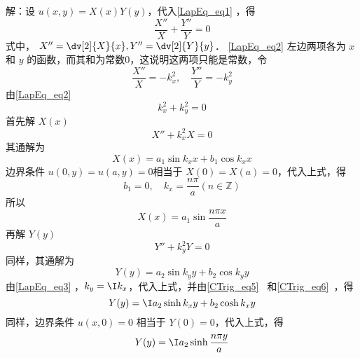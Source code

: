解：设 $u(x,y)=X(x)Y(y)$，代入\autoref{LapEq_eq1} ，得
\begin{equation}\label{LapEq_eq2}
\frac{X''}{X}+\frac{Y''}{Y}=0
\end{equation}
式中， $X''=\dv[2]{X}{x},Y''=\dv[2]{Y}{y}$．
\autoref{LapEq_eq2} 左边两项各为 $x$ 和 $y$ 的函数，而其和为常数0，这说明这两项只能是常数，令
\begin{equation}
\frac{X''}{X}=-k_x^2,\quad \frac{Y''}{Y}=-k_y^2
\end{equation}
由\autoref{LapEq_eq2} 
\begin{equation}\label{LapEq_eq3}
k_x^2+k_y^2=0
\end{equation}
首先解 $X(x)$
\begin{equation}
X''+k_x^2X=0
\end{equation}
其通解为
\begin{equation}
X(x)=a_1\sin k_x x+b_1\cos k_x x
\end{equation}
边界条件 $u(0,y)=u(a,y)=0$相当于 $X(0)=X(a)=0$，代入上式，得
\begin{equation}
b_1=0,\quad k_x=\frac{n\pi}{a}(n\in \mathbb{Z})
\end{equation}
所以
\begin{equation}
X(x)=a_1\sin\frac{n\pi x}{a}
\end{equation}
再解 $Y(y)$
\begin{equation}
Y''+k_y^2Y=0
\end{equation}
同样，其通解为
\begin{equation}
Y(y)=a_2\sin k_y y+b_2\cos k_y y
\end{equation}
由\autoref{LapEq_eq3} ，$k_y=\I k_x$，代入上式，并由\autoref{CTrig_eq5}~ 和\autoref{CTrig_eq6}~，得
\begin{equation}
Y(y)=\I a_2\sinh k_x y+b_2\cosh k_x y
\end{equation}
同样，边界条件 $u(x,0)=0$ 相当于 $Y(0)=0$，代入上式，得
\begin{equation}
Y(y)=\I a_2\sinh\frac{n\pi y}{a}
\end{equation}


